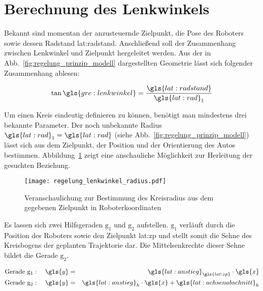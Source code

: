 \section{Berechnung des Lenkwinkels \dcfirstauthorshort}
\label{sec:regelung:lenkwinkel}

Bekannt sind momentan der anzusteuernde Zielpunkt, die Pose des Roboters sowie dessen Radstand \gls{lat:radstand}. Anschließend soll der Zusammenhang zwischen Lenkwinkel und Zielpunkt hergeleitet werden. 
Aus der in Abb.~\ref{fig:regelung_prinzip_modell} dargestellten Geometrie lässt sich folgender Zusammenhang ablesen:

\begin{equation}
\tan \gls{gre:lenkwinkel} = \frac{\gls{lat:radstand}}{{\gls{lat:rad}}_1}
\label{eq:regelung_lenkwinkel_lenkwinkeltan}
\end{equation}

Um einen Kreis eindeutig definieren zu können, benötigt man mindestens drei bekannte Parameter. Der noch unbekannte Radius \({\gls{lat:rad}}_1 = \gls{lat:rad}\) (siehe Abb.~\ref{fig:regelung_prinzip_modell}) lässt sich aus dem Zielpunkt, der Position und der Orientierung des Autos bestimmen. Abbildung~\ref{fig:regelung_lenkwinkel_radius} zeigt eine anschauliche Möglichkeit zur Herleitung der gesuchten Beziehung. 

\begin{figure}[H] %
  \centering
  \texttt{[image: regelung\_lenkwinkel\_radius.pdf]}
  \caption{Veranschaulichung zur Bestimmung des Kreisradius aus dem gegebenen Zielpunkt in Roboterkoordinaten}
  \label{fig:regelung_lenkwinkel_radius}
\end{figure}

Es lassen sich zwei Hilfsgeraden \( \mathrm{g_1} \) und \( \mathrm{g_2} \) aufstellen. \( \mathrm{g_1}\) verläuft durch die Position des Roboters  sowie den Zielpunkt \gls{lat:zp} und stellt somit die Sehne des Kreisbogens der geplanten Trajektorie dar. Die Mittelsenkrechte dieser Sehne bildet die Gerade \( \mathrm{g_2} \).

\begin{eqnarray}
\text{Gerade } \mathrm{g_1}: \quad \gls{y} & = & {\gls{lat:anstieg}}_{\gls{lat:zp}} \cdot \gls{x} 	\\
\text{Gerade } \mathrm{g_2}: \quad \gls{y} & = & {\gls{lat:anstieg}}_h \cdot \gls{x} + {\gls{lat:achsenabschnitt}}_h  \label{eq:regelung_lenkwinkel_geradengleichung2}
\end{eqnarray}

